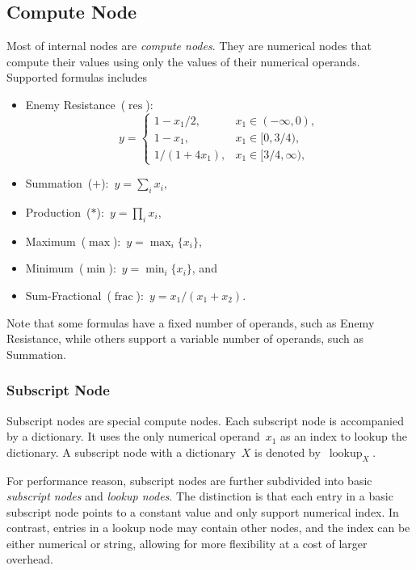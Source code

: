 \documentclass{article}
\DeclareMathOperator{\resNode}{res}
\DeclareMathOperator{\fracNode}{frac}
\DeclareMathOperator{\subscriptNode}{lookup}
\begin{document}
\subsection{Compute Node}

Most of internal nodes are \emph{compute nodes}.
They are numerical nodes that compute their values using only the values of their numerical operands.
Supported formulas includes
%
\begin{itemize}
  \item Enemy Resistance~($\resNode$):
        \begin{equation*}
          y = \begin{cases}
            1 - x_1/2,    & x_1 \in (-\infty, 0),  \\
            1 - x_1,      & x_1 \in [0, 3/4),      \\
            1/(1 + 4x_1), & x_1 \in [3/4, \infty),
          \end{cases}
        \end{equation*}
  \item Summation~($+$):~$y = \sum_i x_i$,
  \item Production~($*$):~$y = \prod_i x_i$,
  \item Maximum~($\max$):~$y = \max_i\{ x_i \}$,
  \item Minimum~($\min$):~$y = \min_i\{ x_i \}$, and
  \item Sum-Fractional~($\fracNode$):~$y = {x_1} / (x_1 + x_2)$.
\end{itemize}
%
Note that some formulas have a fixed number of operands, such as Enemy Resistance, while others support a variable number of operands, such as Summation.

\subsubsection{Subscript Node}

Subscript nodes are special compute nodes.
Each subscript node is accompanied by a dictionary.
It uses the only numerical operand~$x_1$ as an index to lookup the dictionary.
A subscript node with a dictionary~$X$ is denoted by~$\subscriptNode_X$.

For performance reason, subscript nodes are further subdivided into basic \emph{subscript nodes} and \emph{lookup nodes}.
The distinction is that each entry in a basic subscript node points to a constant value and only support numerical index.
In contrast, entries in a lookup node may contain other nodes, and the index can be either numerical or string, allowing for more flexibility at a cost of larger overhead.
\end{document}
